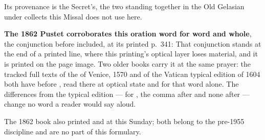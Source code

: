 Its provenance is the Secret's, the two standing together in the Old Gelasian
under collects this Missal does not use here.

\textbf{The 1862 Pustet corroborates this oration word for word and whole}, the
conjunction  before  included, at its printed
p.~341:  That conjunction stands at the end of a printed
line, where this printing's optical layer loses material, and it is printed on
the page image. Two older books carry it at the same prayer: the tracked full
texts of the  of Venice, 1570 and of the Vatican typical
edition of 1604 both have  before , read there at
optical state and for that word alone. The differences from the typical
edition ---  for , the comma after  and none
after  --- change no word a reader would say aloud.

The 1862 book also printed  and
 at this Sunday; both belong to the pre-1955
discipline and are no part of this formulary.

\clearpage
